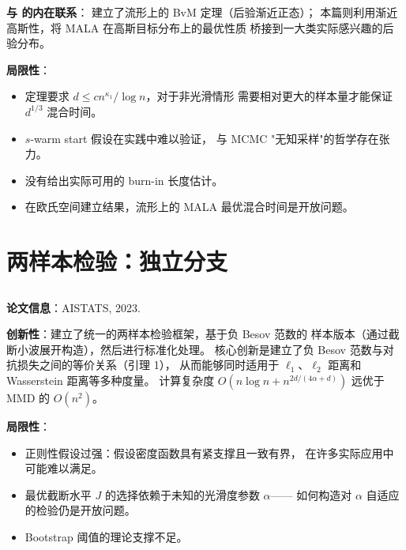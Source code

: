 \textbf{与 \citep{tang2023robust} 的内在联系}：
\citep{tang2023robust} 建立了流形上的 BvM 定理（后验渐近正态）；
本篇则利用渐近高斯性，将 MALA 在高斯目标分布上的最优性质
桥接到一大类实际感兴趣的后验分布。

\textbf{局限性}：

\begin{itemize}
    \item 定理要求 $d \leq c n^{\kappa_1}/\log n$，对于非光滑情形
          需要相对更大的样本量才能保证 $d^{1/3}$ 混合时间。
    \item $s$-warm start 假设在实践中难以验证，
          与 MCMC "无知采样"的哲学存在张力。
    \item 没有给出实际可用的 burn-in 长度估计。
    \item 在欧氏空间建立结果，流形上的 MALA 最优混合时间是开放问题。
\end{itemize}

\section{两样本检验：独立分支}\label{sec:twosample}

\subsection{\citep{tang2023twosample}}\label{sec:ch0-aistats2023}

\textbf{论文信息}：AISTATS, 2023.

\textbf{创新性}：建立了统一的两样本检验框架，基于负 Besov 范数的
样本版本（通过截断小波展开构造），然后进行标准化处理。
核心创新是建立了负 Besov 范数与对抗损失之间的等价关系（引理 1），
从而能够同时适用于 $\ell_1$、$\ell_2$ 距离和 Wasserstein 距离等多种度量。
计算复杂度 $O(n\log n + n^{2d/(4\alpha+d)})$ 远优于 MMD 的 $O(n^2)$。

\textbf{局限性}：

\begin{itemize}
    \item 正则性假设过强：假设密度函数具有紧支撑且一致有界，
          在许多实际应用中可能难以满足。
    \item 最优截断水平 $J$ 的选择依赖于未知的光滑度参数 $\alpha$——
          如何构造对 $\alpha$ 自适应的检验仍是开放问题。
    \item Bootstrap 阈值的理论支撑不足。
\end{itemize}

